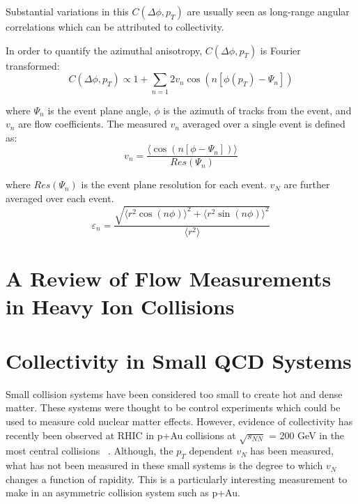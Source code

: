 Substantial variations in this $C(\Delta\phi,p_T)$ are usually seen as long-range angular correlations which can be attributed to collectivity.

In order to quantify the azimuthal anisotropy, $C(\Delta\phi,p_T)$ is Fourier transformed:
\begin{equation}\label{eqn:dndphi}
  C(\Delta\phi,p_T) \propto 1 + \sum_{n=1}2 v_{n}\cos(n[\phi(p_T)-\Psi_n]) 
\end{equation}

where $\Psi_n$ is the event plane angle, $\phi$ is the azimuth of tracks from the event, and $v_n$ are flow coefficients. The measured $v_n$ averaged over a single event is defined as:
\begin{equation}\label{eqn:vn}
  v_n = \frac{\langle\cos(n[\phi-\Psi_n])\rangle}{Res(\Psi_n)}
\end{equation}

where $Res(\Psi_n)$ is the event plane resolution for each event. $v_N$ are further averaged over each event.
\begin{equation}
\varepsilon_n = \frac{\sqrt{\langle r^2\cos (n\phi)\rangle ^2 + \langle r^2\sin (n\phi) \rangle ^2}}{\langle r^2 \rangle}
\end{equation}

\section{A Review of Flow Measurements in Heavy Ion Collisions}

\section{Collectivity in Small QCD Systems}
Small collision systems have been considered too small to create hot and dense matter. These systems were thought to be control experiments which could be used to measure cold nuclear matter effects. However, evidence of collectivity has recently been observed at RHIC in p+Au collisions at $\sqrt{s_{NN}}$ = 200 GeV in the most central collisions ~\cite{PhysRevLett.115.142301}. Although, the $p_T$ dependent $v_N$ has been measured, what has not been measured in these small systems is the degree to which $v_N$ changes a function of rapidity. This is a particularly interesting measurement to make in an asymmetric collision system such as p+Au.

